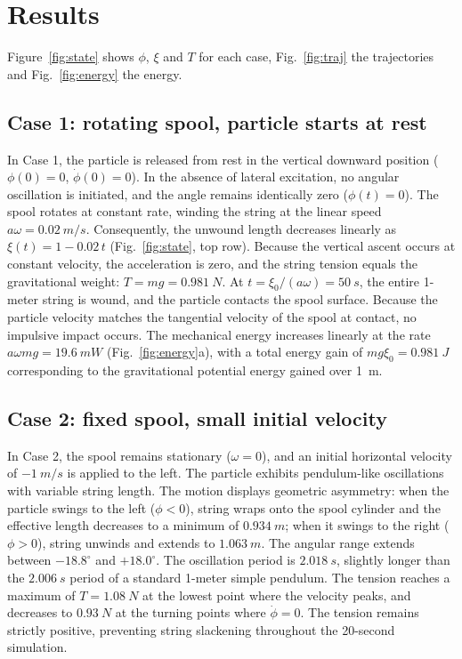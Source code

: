 \documentclass[11pt,a4paper]{article}
\newcommand{\dt}[1]{\dot{#1}}
\begin{document}
\section{Results}\label{sec:results}
Figure~\ref{fig:state} shows $\phi$, $\xi$ and $T$ for each case, Fig.~\ref{fig:traj} the trajectories and Fig.~\ref{fig:energy} the energy.

\subsection{Case 1: rotating spool, particle starts at rest}
In Case 1, the particle is released from rest in the vertical downward position ($\phi(0)=0$, $\dt\phi(0)=0$). In the absence of lateral excitation, no angular oscillation is initiated, and the angle remains identically zero ($\phi(t)=0$). The spool rotates at constant rate, winding the string at the linear speed $a\omega = \SI{0.02}{m/s}$. Consequently, the unwound length decreases linearly as $\xi(t) = 1 - 0.02\,t$ (Fig.~\ref{fig:state}, top row). Because the vertical ascent occurs at constant velocity, the acceleration is zero, and the string tension equals the gravitational weight: $T = mg = \SI{0.981}{N}$. At $t = \xi_0/(a\omega) = \SI{50}{s}$, the entire 1-meter string is wound, and the particle contacts the spool surface. Because the particle velocity matches the tangential velocity of the spool at contact, no impulsive impact occurs. The mechanical energy increases linearly at the rate $a\omega mg = \SI{19.6}{mW}$ (Fig.~\ref{fig:energy}a), with a total energy gain of $mg\xi_0 = \SI{0.981}{J}$ corresponding to the gravitational potential energy gained over \SI{1}{m}.

\subsection{Case 2: fixed spool, small initial velocity}
In Case 2, the spool remains stationary ($\omega = 0$), and an initial horizontal velocity of $\SI{-1}{m/s}$ is applied to the left. The particle exhibits pendulum-like oscillations with variable string length. The motion displays geometric asymmetry: when the particle swings to the left ($\phi < 0$), string wraps onto the spool cylinder and the effective length decreases to a minimum of $\SI{0.934}{m}$; when it swings to the right ($\phi > 0$), string unwinds and extends to $\SI{1.063}{m}$. The angular range extends between $-18.8^\circ$ and $+18.0^\circ$. The oscillation period is $\SI{2.018}{s}$, slightly longer than the $\SI{2.006}{s}$ period of a standard 1-meter simple pendulum. The tension reaches a maximum of $T = \SI{1.08}{N}$ at the lowest point where the velocity peaks, and decreases to $\SI{0.93}{N}$ at the turning points where $\dt\phi=0$. The tension remains strictly positive, preventing string slackening throughout the 20-second simulation.
\end{document}
